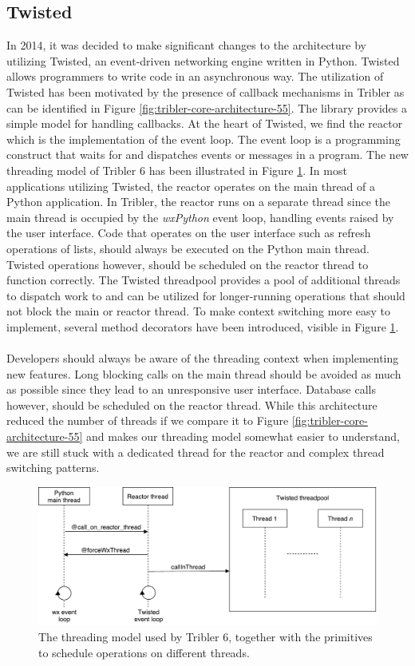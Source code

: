 \subsection{Twisted}
\label{subsec:architecture-twisted}
In 2014, it was decided to make significant changes to the architecture by utilizing Twisted, an event-driven networking engine written in Python. Twisted allows programmers to write code in an asynchronous way. The utilization of Twisted has been motivated by the presence of callback mechanisms in Tribler as can be identified in Figure \ref{fig:tribler-core-architecture-55}. The library provides a simple model for handling callbacks. At the heart of Twisted, we find the reactor which is the implementation of the event loop\cite{twistedreactoroverview}. The event loop is a programming construct that waits for and dispatches events or messages in a program.
The new threading model of Tribler 6 has been illustrated in Figure \ref{fig:old-threading-model}. In most applications utilizing Twisted, the reactor operates on the main thread of a Python application. In Tribler, the reactor runs on a separate thread since the main thread is occupied by the \emph{wxPython} event loop, handling events raised by the user interface. Code that operates on the user interface such as refresh operations of lists, should always be executed on the Python main thread. Twisted operations however, should be scheduled on the reactor thread to function correctly. The Twisted threadpool provides a pool of additional threads to dispatch work to and can be utilized for longer-running operations that should not block the main or reactor thread. To make context switching more easy to implement, several method decorators have been introduced, visible in Figure \ref{fig:old-threading-model}.\\\\
Developers should always be aware of the threading context when implementing new features. Long blocking calls on the main thread should be avoided as much as possible since they lead to an unresponsive user interface. Database calls however, should be scheduled on the reactor thread. While this architecture reduced the number of threads if we compare it to Figure \ref{fig:tribler-core-architecture-55} and makes our threading model somewhat easier to understand, we are still stuck with a dedicated thread for the reactor and complex thread switching patterns.

\begin{figure}[h!]
	\centering
	\includegraphics[width=0.9\columnwidth]{images/architecture/threading_model_tribler}
	\caption{The threading model used by Tribler 6, together with the primitives to schedule operations on different threads.}
	\label{fig:old-threading-model}
\end{figure}

